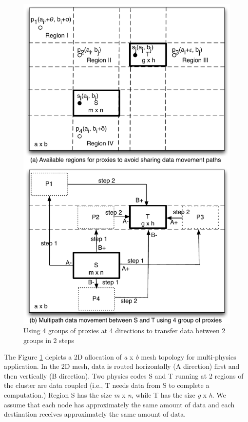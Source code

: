 \begin{figure}[!htb]
\vspace{-0.1in}
\centering
\includegraphics[scale=0.5]{figures/groxies.pdf}
\vspace{-0.1in}
\caption{Using 4 groups of proxies at 4 directions to transfer data between 2 groups in 2 steps}
\vspace{-0.2in}
\label{fig:groxies}
\end{figure}

The Figure \ref{fig:groxies} depicts a 2D allocation of \textit{a} x \textit{b} mesh topology for multi-physics application. In the 2D mesh, data is routed horizontally (A direction) first and then vertically (B direction). Two physics codes S and T running at 2 regions of the cluster are data coupled (i.e., T needs data from S to complete a computation.) Region S has the size \textit{m} x \textit{n}, while T has the size \textit{g} x \textit{h}. We assume that each node has approximately the same amount of data and each destination receives approximately the same amount of data.

